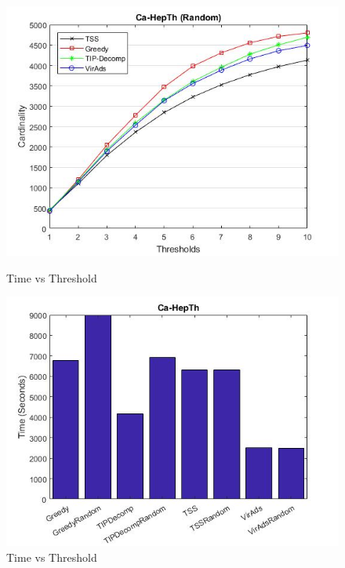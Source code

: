 \begin{figure}[h!]
\begin{minipage}[t]{0.50\textwidth}
\includegraphics[width=\linewidth,keepaspectratio=true]{images/ca-hepthresultrandom.jpg}
\caption{Time vs Threshold}

\end{minipage}
\begin{minipage}[t]{0.50\textwidth}
\includegraphics[width=\linewidth,keepaspectratio=true]{images/hepthtime.jpg}
\caption{Time vs Threshold}
\end{minipage}
\end{figure}

